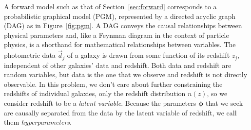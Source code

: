 \documentclass[iop]{emulateapj}
\newcommand{\Sect}[1]{Section~\ref{#1}}
\newcommand{\Fig}[1]{Figure~\ref{#1}}
\newcommand{\data}{\ensuremath{\vec{d}}}%
\newcommand{\nz}{$n(z)$}
\newcommand{\bvec}[1]{\ensuremath{\boldsymbol{#1}}}%
\newcommand{\ndphi}{\bvec{\phi}}
\begin{document}
A forward model such as that of \Sect{sec:forward} corresponds to a probabilistic graphical model (PGM), represented by a directed acyclic graph (DAG) as in \Fig{fig:pgm}.
A DAG conveys the causal relationships between physical parameters and, like a Feynman diagram in the context of particle physics, is a shorthand for mathematical relationships between variables.
The photometric data $\data_{j}$ of a galaxy is drawn from some function of its redshift $z_{j}$, independent of other galaxies' data and redshift.
Both data and redshift are random variables, but data is the one that we observe and redshift is not directly observable.
In this problem, we don't care about further constraining the redshifts of individual galaxies, only the redshift distribution \nz, so we consider redshift to be a \textit{latent variable}.
Because the parameters $\ndphi$ that we seek are causally separated from the data by the latent variable of redshift, we call them \textit{hyperparameters}.
\end{document}
